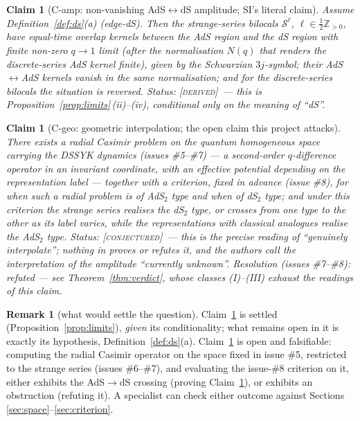 \documentclass[11pt,a4paper]{article}
\newcommand{\DERIVED}{{\color{teal}\textsc{[derived]}}}
\newcommand{\CONJ}{{\color{violet}\textsc{[conjectured]}}}
\theoremstyle{definition}
\newtheorem{remark}[definition]{Remark}
\theoremstyle{plain}
\newtheorem{claim}[definition]{Claim}
\newcommand{\Z}{\mathbb{Z}}
\begin{document}
\begin{claim}[C-amp: non-vanishing AdS$\leftrightarrow$dS amplitude; SI's literal claim]
\label{claim:camp}
Assume Definition~\ref{def:ds}(a) (edge-dS). Then the strange-series bilocals
$\mathcal{S}^{\ell}$, $\ell\in\tfrac12\Z_{>0}$, have equal-time overlap kernels between the AdS
region and the dS region with finite non-zero $q\to1$ limit (after the normalisation $N(q)$ that
renders the discrete-series AdS kernel finite), given by the Schwarzian $3j$-symbol; their
AdS$\leftrightarrow$AdS kernels vanish in the same normalisation; and for the discrete-series
bilocals the situation is reversed. \emph{Status:} \DERIVED\ --- this is
Proposition~\ref{prop:limits}\,(ii)--(iv), conditional \emph{only} on the meaning of ``dS''.
\end{claim}

\begin{claim}[C-geo: geometric interpolation; the open claim this project attacks]
\label{claim:cgeo}
There exists a radial Casimir problem on the quantum homogeneous space carrying the DSSYK
dynamics (issues \#5--\#7) --- a second-order $q$-difference operator in an invariant coordinate,
with an effective potential depending on the representation label --- together with a criterion,
fixed in advance (issue \#8), for when such a radial problem is of AdS$_2$ type and when of
dS$_2$ type; and under this criterion the strange series realises the dS$_2$ type, or crosses
from one type to the other as its label varies, while the representations with classical
analogues realise the AdS$_2$ type. \emph{Status:} \CONJ\ --- this is the precise reading of
``genuinely interpolate''; nothing in \cite{Schouten:2025dssyk} proves or refutes it, and the
authors call the interpretation of the amplitude ``currently unknown''. \emph{Resolution
(issues \#7--\#8):} refuted --- see Theorem~\ref{thm:verdict}, whose classes (I)--(III)
exhaust the readings of this claim.
\end{claim}

\begin{remark}[what would settle the question]\label{rem:settle}
Claim~\ref{claim:camp} is settled (Proposition~\ref{prop:limits}), \emph{given} its
conditionality; what remains open in it is exactly its hypothesis, Definition~\ref{def:ds}(a).
Claim~\ref{claim:cgeo} is open and falsifiable: computing the radial Casimir operator on the
space fixed in issue \#5, restricted to the strange series (issues \#6--\#7), and evaluating the
issue-\#8 criterion on it, either exhibits the AdS$\to$dS crossing (proving
Claim~\ref{claim:cgeo}), or exhibits an obstruction (refuting it). A specialist can check either
outcome against Sections \ref{sec:space}--\ref{sec:criterion}.
\end{remark}
\end{document}
